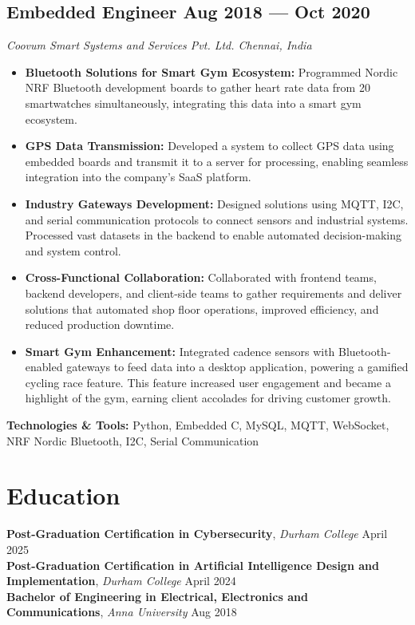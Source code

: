 \documentclass[a4paper,10pt]{article}
\newenvironment{zitemize}{
  \begin{itemize} 
    \itemsep 0pt 
    \parskip 0pt 
    \parsep 1pt
    \topsep 0pt 
    \partopsep 0pt
    \sloppy
}{
  \end{itemize}
  \vspace{0.5em} %
}
\newcommand{\skills}[1]{ {\bfseries #1}} %
\begin{document}
\subsection*{Embedded Engineer \hfill Aug 2018 --- Oct 2020}
\textit{Coovum Smart Systems and Services Pvt. Ltd. \hfill Chennai, India}
\begin{zitemize}
    \item \textbf{Bluetooth Solutions for Smart Gym Ecosystem:} Programmed Nordic NRF Bluetooth development boards to gather heart rate data from 20 smartwatches simultaneously, integrating this data into a smart gym ecosystem.
    \item \textbf{GPS Data Transmission:} Developed a system to collect GPS data using embedded boards and transmit it to a server for processing, enabling seamless integration into the company’s SaaS platform.
    \item \textbf{Industry Gateways Development:} Designed solutions using MQTT, I2C, and serial communication protocols to connect sensors and industrial systems. Processed vast datasets in the backend to enable automated decision-making and system control.
    \item \textbf{Cross-Functional Collaboration:} Collaborated with frontend teams, backend developers, and client-side teams to gather requirements and deliver solutions that automated shop floor operations, improved efficiency, and reduced production downtime.
    \item \textbf{Smart Gym Enhancement:} Integrated cadence sensors with Bluetooth-enabled gateways to feed data into a desktop application, powering a gamified cycling race feature. This feature increased user engagement and became a highlight of the gym, earning client accolades for driving customer growth.
\end{zitemize}
\textbf{Technologies \& Tools:} Python, Embedded C, MySQL, MQTT, WebSocket, NRF Nordic Bluetooth, I2C, Serial Communication

\section{Education}
%   
\skills{Post-Graduation Certification in Cybersecurity}, \textit{Durham College} \hfill	April 2025\\
\skills{Post-Graduation Certification in Artificial Intelligence Design and Implementation}, \textit{Durham College} \hfill	April 2024\\
\skills{Bachelor of Engineering in Electrical, Electronics and Communications}, \textit{Anna University}	\hfill Aug 2018\\
\end{document}
